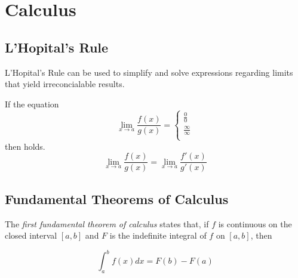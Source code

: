 \section{Calculus}\label{app:Calculus}
\subsection{L'Hopital's Rule}\label{subsec:LHopitals_Rule}
L'Hopital's Rule can be used to simplify and solve expressions regarding limits that yield irreconcialable results.
\begin{lemma}\label{lemma:LHopitals_Rule}
  If the equation
  \begin{equation*}
    \lim\limits_{x \rightarrow a} \frac{f(x)}{g(x)} =
    \begin{cases}
      \frac{0}{0} \\
      \frac{\infty}{\infty} \\
    \end{cases}
  \end{equation*}
  then  holds.
  \begin{equation}\label{eq:LHopitals_Rule}
    \lim\limits_{x \rightarrow a} \frac{f(x)}{g(x)} = \lim\limits_{x \rightarrow a} \frac{f'(x)}{g'(x)}
  \end{equation}
\end{lemma}

\subsection{Fundamental Theorems of Calculus}\label{subsec:Fundamental Theorem of Calculus}
\begin{definition}\label{def:1st Fundamental Theorem of Calculus}
  The \emph{first fundamental theorem of calculus} states that, if $f$ is continuous on the closed interval $\left[ a,b \right]$ and $F$ is the indefinite integral of $f$ on $\left[ a,b \right]$, then

  \begin{equation}\label{eq:1st Fundamental Theorem of Calculus}
    \int_{a}^{b}f \left( x \right) dx = F \left( b \right) - F \left( a \right)
  \end{equation}
\end{definition}

